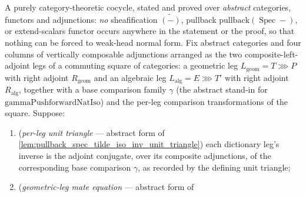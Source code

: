 \begin{lemma}

  \label{lem:ring_square_cocycle}
  A purely category-theoretic cocycle, stated and proved over \emph{abstract} categories, functors
  and adjunctions: \emph{no} sheafification \(\widetilde{(-)}\), pullback
  \(\mathrm{pullback}(\operatorname{Spec}-)\), or extend-scalars functor occurs anywhere in the
  statement or the proof, so that nothing can be forced to weak-head normal form. Fix abstract
  categories and four columns of vertically composable adjunctions arranged as the two
  composite-left-adjoint legs of a commuting square of categories: a geometric leg
  \(L_{\mathrm{geom}} = T \ggg P\) with right adjoint \(R_{\mathrm{geom}}\) and an algebraic leg
  \(L_{\mathrm{alg}} = E \ggg T'\) with right adjoint \(R_{\mathrm{alg}}\), together with a base
  comparison family \(\gamma\) (the abstract stand-in for \(\mathrm{gammaPushforwardNatIso}\)) and the
  per-leg comparison transformations of the square. Suppose:
  \begin{enumerate}
    \item[(i)] (\emph{per-leg unit triangle} --- abstract form of
      \cref{lem:pullback_spec_tilde_iso_inv_unit_triangle}) each dictionary leg's inverse is the
      adjoint conjugate, over its composite adjunctions, of the corresponding base comparison
      \(\gamma\), as recorded by the defining unit triangle;
    \item[(ii)] (\emph{geometric-leg mate equation} --- abstract form of

\end{enumerate}
\end{lemma}
